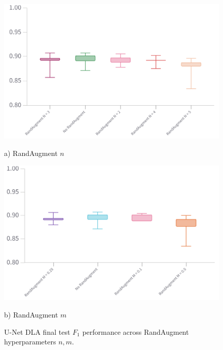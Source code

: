\begin{figure}
    \centering
    \includegraphics[width=0.9\linewidth]{figures/randaugment_n_f1.png}
    \caption*{a) RandAugment $n$}
    \vspace{1em}
    \includegraphics[width=0.9\linewidth]{figures/randaugment_m_f1.png}
    \caption*{b) RandAugment $m$}
    \caption{U-Net DLA final test $F_1$ performance across RandAugment hyperparameters $n,m$.}
    \label{fig:randaug-f1}
\end{figure}


